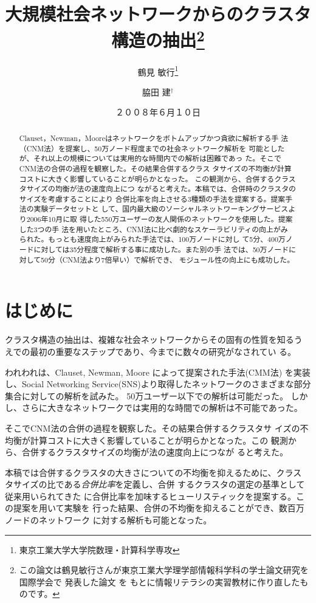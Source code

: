 \documentclass [a4j,11pt] {jsarticle}
\title  {大規模社会ネットワークからのクラスタ構造の抽出\thanks {
  この論文は鶴見敏行さんが東京工業大学理学部情報科学科の学士論文研究を国際学会で
  発表した論文 \protect\cite {wakita-2007-finding-community-structure-in-mega-scale-social}を
  もとに情報リテラシの実習教材に作り直したものです。}}
\author {鶴見 敏行\thanks {東京工業大学大学院数理・計算科学専攻} \and 脇田 建{$^\dagger$}}
\date {２００８年６月１０日}
\begin{document}
\maketitle


\begin {abstract}
Clauset，Newman，Mooreはネットワークをボトムアップかつ貪欲に解析する手
法（CNM法）を提案し、50万ノード程度までの社会ネットワーク解析を
可能としたが、それ以上の規模については実用的な時間内での解析は困難であっ
た。そこでCNM法の合併の過程を観察した。その結果合併するクラス
タサイズの不均衡が計算コストに大きく影響していることが明らかとなった。
この観測から、合併するクラスタサイズの均衡が法の速度向上につ
ながると考えた。本稿では、合併時のクラスタのサイズを考慮することにより
合併比率を向上させる3種類の手法を提案する。提案手法の実験データセットと
して、国内最大級のソーシャルネットワーキングサービスより2006年10月に取
得した550万ユーザーの友人関係のネットワークを使用した。提案した3つの手
法を用いたところ、CNM法に比べ劇的なスケーラビリティの向上がみ
られた。もっとも速度向上がみられた手法では、100万ノードに対し
て5分、400万ノードに対しては35分程度で解析する事に成功した。また別の手
法では、50万ノードに対して50分（CNM法より7倍早い）で解析でき、
モジュール性の向上にも成功した。
\end {abstract}

\section {はじめに}
\label {sect: はじめに}


クラスタ構造の抽出は、複雑な社会ネットワークからその固有の性質を知るう
えでの最初の重要なステップであり、今までに数々の研究がなされてい
る。
\cite{Kleinberg99,
  Page99,
  Dean99,
  Kumar99,
  Miller01,
  Toyoda01,
  Wu04,
  Cai04,
  Clauset04,
  Onsjo06}


われわれは、Clauset, Newman, Moore によって提案された手法(CMM法)
\cite{Clauset04}
を実装し、Social Networking Service(SNS)より取得したネットワークのさまざまな部分集合に対しての解析を試みた。
50万ユーザー以下での解析は可能だった。
しかし、さらに大きなネットワークでは実用的な時間での解析は不可能であった。

そこでCNM法の合併の過程を観察した。その結果合併するクラスタサ
イズの不均衡が計算コストに大きく影響していることが明らかとなった。この
観測から、合併するクラスタサイズの均衡が法の速度向上につなが
ると考えた。

本稿では合併するクラスタの大きさについての不均衡を抑えるために、クラス
タサイズの比である\emph {合併比率}を定義し、合併
するクラスタの選定の基準として従来用いられてきた
に合併比率を加味するヒューリスティックを提案する。この提案を用いて実験を
行った結果、合併の不均衡を抑えることができ、数百万ノードのネットワーク
に対する解析も可能となった。
\end{document}
